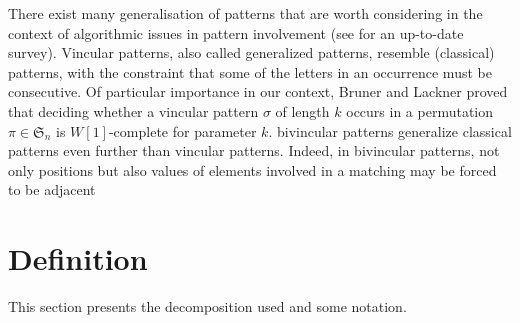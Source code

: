 \documentclass[a4paper]{llncs}
\newcommand{\ptext}{\pi}
\newcommand{\pmotif}{\sigma}
\begin{document}
	There exist many generalisation of patterns that are worth considering
	in the context of algorithmic issues in pattern involvement
	(see \cite{Kitaev:book:2011} for an up-to-date survey).
	Vincular patterns, also called generalized patterns,
	resemble (classical) patterns, with the constraint that some of the letters in
	an occurrence must be consecutive.
	Of particular importance in our context,
	Bruner and Lackner \cite{Bruner:Lackner:SWAT:2012}
	proved that deciding whether a vincular pattern
	$\sigma$ of length $k$ occurs in a permutation
	$\pi \in \mathfrak{S}_n$ is $W[1]$-complete for
	parameter $k$.
	bivincular patterns generalize classical patterns even further than vincular
	patterns. Indeed, in bivincular patterns, not only positions but also values
	of elements involved in a matching may be forced to be adjacent


	
%	 
%
%	
	

	
	

	
	\section{Definition}

		This section presents the decomposition used and some notation.\\	
		
\end{document}
